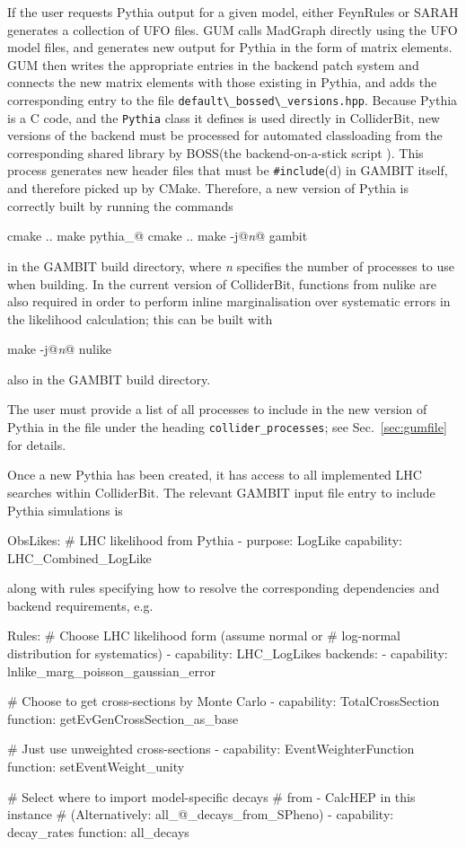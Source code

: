 \documentclass[pdftex,twocolumn,epjc3_preprint,runningheads]{svjour3}
\renewcommand{\_}{\discretionary{\underscore}{}{\underscore}}
\newcommand\cpp[1]{{\lstinline!#1!}}  %
\newcommand\term[1]{{\lstset{style=terminal}\lstinline!#1!\lstset{style=cpp}}}
\newcommand\guminline[1]{{{\lstset{style=gum}\lstinline!#1!}}}
\newcommand{\metavarf}[1]{\textit{\color{darkgreen}\footnotesize\textrm{#1}}}
\newcommand{\metavar}{\metavarf}
\newcommand{\gambit}{\textsf{GAMBIT}\xspace}
\newcommand{\colliderbit}{\textsf{ColliderBit}\xspace}
\newcommand{\BOSS}{\textsf{BOSS}\xspace}
\newcommand{\GB}{\gambit}
\newcommand{\pythia}{\textsf{Pythia}\xspace}
\newcommand\nulike{\textsf{nulike}\xspace}
\newcommand{\gum}{\textsf{GUM}\xspace}
\newcommand{\dgum}{\!\!\term{.gum}\!\xspace}
\newcommand{\fr}{\textsf{FeynRules}\xspace}
\newcommand{\sarah}{\textsf{SARAH}\xspace}
\newcommand{\MG}{\textsf{MadGraph}\xspace}
\newcommand{\ufo}{\textsf{UFO}\xspace}
\newcommand\xx{\raisebox{0.2ex}{\smaller ++}\xspace}
\newcommand\Cpp{\textsf{C\xx}\xspace}
\newcommand\cmake{\textsf{CMake}\xspace}
\begin{document}
If the user requests \pythia output for a given model, either \fr or \sarah generates a collection of \ufo files. \gum calls \MG directly using the \ufo model files, and generates new output for \pythia in the form of matrix elements. \gum then writes the appropriate entries in the backend patch system and connects the new matrix elements with those existing in \pythia, and adds the corresponding entry to the file \term{default\_bossed\_versions.hpp}.  Because \pythia is a \Cpp code, and the \cpp{Pythia} class it defines is used directly in \colliderbit, new versions of the backend must be processed for automated classloading from the corresponding shared library by \BOSS (the backend-on-a-stick script \cite{gambit}).  This process generates new header files that must be \term{#include}(d) in \GB itself, and therefore picked up by \cmake. Therefore, a new version of \pythia is correctly built by running the commands
%
\begin{lstterm}
cmake ..
make pythia_@\nm@
cmake ..
make -j@\metavar{n}@ gambit
\end{lstterm}
%
in the \GB build directory, where \metavar{n} specifies the number of processes to use when building.
In the current version of \colliderbit, functions from \nulike \cite{IC22Methods,IC79_SUSY} are also required in order to perform inline marginalisation over systematic errors in the likelihood calculation; this can be built with
\begin{lstterm}
make -j@\metavar{n}@ nulike
\end{lstterm}
also in the \GB build directory.

The user must provide a list of all processes to include in the new version of \pythia in the \dgum file under the heading \guminline{collider_processes}; see Sec.~\ref{sec:gumfile} for details.

Once a new \pythia has been created, it has access to all implemented LHC searches within \colliderbit. The relevant \gambit input file entry to include \pythia simulations is
%
\begin{lstyaml}
ObsLikes:
  # LHC likelihood from Pythia
  - purpose:      LogLike
    capability:   LHC_Combined_LogLike
\end{lstyaml}
%
along with rules specifying how to resolve the corresponding dependencies and backend requirements, e.g.
%
\begin{lstyaml}
Rules:
  # Choose LHC likelihood form (assume normal or
  # log-normal distribution for systematics)
  - capability: LHC_LogLikes
    backends:
    - {capability: lnlike_marg_poisson_gaussian_error}

  # Choose to get cross-sections by Monte Carlo
  - capability: TotalCrossSection
    function: getEvGenCrossSection_as_base

  # Just use unweighted cross-sections
  - capability: EventWeighterFunction
    function: setEventWeight_unity

  # Select where to import model-specific decays
  # from - CalcHEP in this instance
  # (Alternatively: all_@\nm@_decays_from_SPheno)
  - capability: decay_rates
    function: all_decays
\end{lstyaml}
\end{document}
